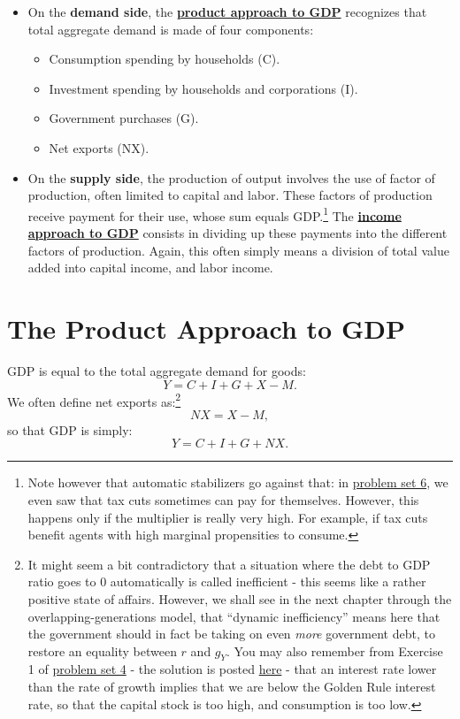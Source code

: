 \documentclass[]{book}
\providecommand{\tightlist}{%
  \setlength{\itemsep}{0pt}\setlength{\parskip}{0pt}}
\let\rmarkdownfootnote\footnote%
\def\footnote{\protect\rmarkdownfootnote}
\theoremstyle{definition}
\theoremstyle{definition}
\theoremstyle{definition}
\theoremstyle{remark}
\begin{document}
\begin{itemize}
\tightlist
\item
  On the \textbf{demand side}, the
  \protect\hyperlink{gdp-product}{\textbf{product approach to GDP}}
  recognizes that total aggregate demand is made of four components:

  \begin{itemize}
  \tightlist
  \item
    Consumption spending by households (C).
  \item
    Investment spending by households and corporations (I).
  \item
    Government purchases (G).
  \item
    Net exports (NX).
  \end{itemize}
\item
  On the \textbf{supply side}, the production of output involves the use
  of factor of production, often limited to capital and labor. These
  factors of production receive payment for their use, whose sum equals
  GDP.\footnote{Note however that automatic stabilizers go against that:
    in \href{pset6.html}{problem set 6}, we even saw that tax cuts
    sometimes can pay for themselves. However, this happens only if the
    multiplier is really very high. For example, if tax cuts benefit
    agents with high marginal propensities to consume.} The
  \protect\hyperlink{gdp-income}{\textbf{income approach to GDP}}
  consists in dividing up these payments into the different factors of
  production. Again, this often simply means a division of total value
  added into capital income, and labor income.
\end{itemize}

\hypertarget{gdp-product}{\section{The Product Approach to
GDP}\label{gdp-product}}

GDP is equal to the total aggregate demand for goods:
\[ Y = C + I + G + X -M.\] We often define net exports as:\footnote{It
  might seem a bit contradictory that a situation where the debt to GDP
  ratio goes to 0 automatically is called inefficient - this seems like
  a rather positive state of affairs. However, we shall see in the next
  chapter through the overlapping-generations model, that ``dynamic
  inefficiency'' means here that the government should in fact be taking
  on even \emph{more} government debt, to restore an equality between
  \(r\) and \(g_Y\). You may also remember from Exercise 1 of
  \href{pset4.html}{problem set 4} - the solution is posted
  \href{pset4-sol.html}{here} - that an interest rate lower than the
  rate of growth implies that we are below the Golden Rule interest
  rate, so that the capital stock is too high, and consumption is too
  low.} \[NX = X-M,\] so that GDP is simply: \[ Y = C + I + G + NX.\]
\end{document}
